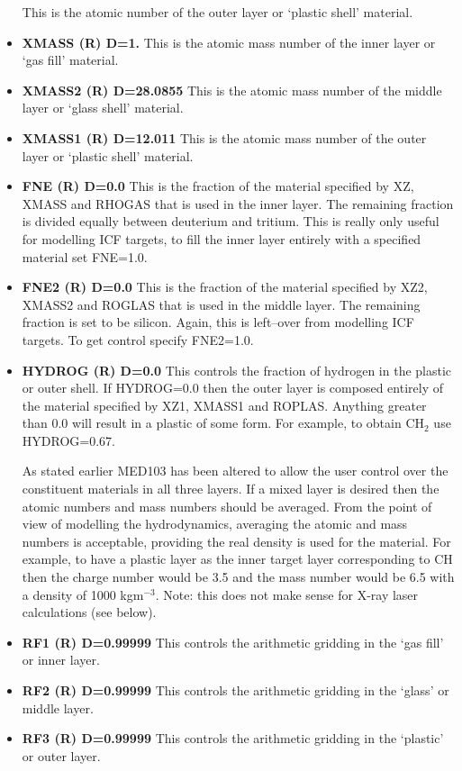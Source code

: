 \begin{itemize}
This is the atomic number of the outer layer  or `plastic
shell' material.
\item {\bf XMASS (R) D=1.}
This is the atomic mass number of the inner layer or `gas fill' material.
\item {\bf XMASS2 (R) D=28.0855}
This is the atomic mass number of the middle layer or `glass
shell' material.
\item {\bf XMASS1 (R) D=12.011}
This is the atomic mass number of the outer layer
or `plastic shell' material.
\item {\bf FNE (R) D=0.0}
This is the fraction of the material specified by XZ, XMASS and RHOGAS
that is used in the inner layer. The remaining fraction is divided
equally between deuterium and tritium. This is really only useful for
modelling ICF targets, to fill the inner layer entirely with a specified
material set FNE=1.0.
\item{\bf FNE2 (R) D=0.0}
This is the fraction of the material specified by XZ2, XMASS2 and ROGLAS
that is used in the middle layer. The remaining fraction is set to be
silicon. Again, this is left--over from modelling ICF targets. To get
control specify FNE2=1.0.
\item{\bf HYDROG (R) D=0.0}
This controls the fraction of hydrogen in the plastic or outer shell. If
HYDROG=0.0 then the outer layer is composed entirely of the material
specified by XZ1, XMASS1 and ROPLAS. Anything greater than 0.0 will
result in a plastic of some form. For example, to obtain CH$_2$ use
HYDROG=0.67.
 
As stated earlier MED103 has been altered to allow the user control
over the constituent materials in all three layers. If a mixed layer is
desired then the atomic numbers and mass numbers should be averaged.
From the point of
view of modelling the hydrodynamics, averaging the atomic and mass
numbers is acceptable, providing the real
density is used for the material.
For example, to have a plastic layer as the inner
target layer corresponding to CH then the charge number would be 3.5 and
the mass number would be 6.5 with a density of 1000 kgm$^{-3}$.
Note: this does not make sense for X-ray laser calculations
(see below).
\item {\bf RF1 (R) D=0.99999}
This controls the arithmetic gridding in the `gas fill' or inner layer.
\item {\bf RF2 (R) D=0.99999}
This controls the arithmetic gridding in the `glass' or middle
layer.
\item {\bf RF3 (R) D=0.99999}
This controls the arithmetic gridding in the `plastic' or outer layer.


\end{itemize}
